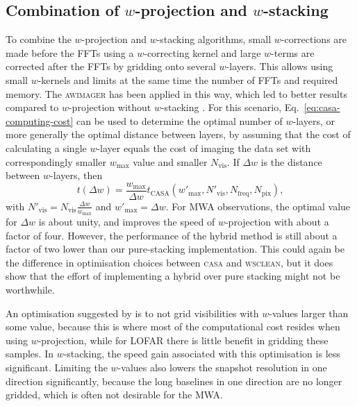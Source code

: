 \documentclass[useAMS,usenatbib]{mn2e}
\begin{document}
\subsection{Combination of $w$-projection and $w$-stacking}
To combine the $w$-projection and $w$-stacking algorithms, small $w$-corrections are made before the FFTs using a $w$-correcting kernel and large $w$-terms are corrected after the FFTs by gridding onto several $w$-layers. This allows using small $w$-kernels and limits at the same time the number of FFTs and required memory. The \textsc{awimager} has been applied in this way, which led to better results compared to $w$-projection without $w$-stacking \citep{awimager-2013}. For this scenario, Eq.~\eqref{eq:casa-computing-cost} can be used to determine the optimal number of $w$-layers, or more generally the optimal distance between layers, by assuming that the cost of calculating a single $w$-layer equals the cost of imaging the data set with correspondingly smaller $w_{\max}$ value and smaller $N_\textrm{vis}$. If $\Delta w$ is the distance between $w$-layers, then 
\begin{equation}
t(\Delta w) = \frac{w_{\max}}{\Delta w} t_\textrm{CASA}(w'_{\max},N'_\textrm{vis},N_\textrm{freq},N_\textrm{pix}),
\end{equation}
with $N'_\textrm{vis} = N_\textrm{vis}\frac{\Delta w}{w_{\max}}$ and $w'_{\max} = \Delta w$. For MWA observations, the optimal value for $\Delta w$ is about unity, and improves the speed of $w$-projection with about a factor of four. However, the performance of the hybrid method is still about a factor of two lower than our pure-stacking implementation. This could again be the difference in optimisation choices between \textsc{casa} and \textsc{wsclean}, but it does show that the effort of implementing a hybrid over pure stacking might not be worthwhile.

An optimisation suggested by \citet{awimager-2013} is to not grid visibilities with $w$-values larger than some value, because this is where most of the computational cost resides when using $w$-projection, while for LOFAR there is little benefit in gridding these samples. In $w$-stacking, the speed gain associated with this optimisation is less significant. Limiting the $w$-values also lowers the snapshot resolution in one direction significantly, because the long baselines in one direction are no longer gridded, which is often not desirable for the MWA.
\end{document}
